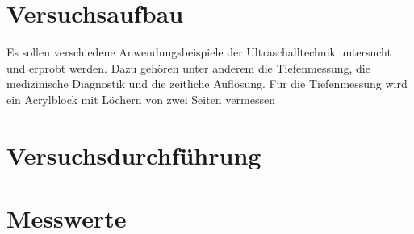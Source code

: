 


\section{Versuchsaufbau}

Es sollen verschiedene Anwendungsbeispiele der Ultraschalltechnik untersucht und erprobt werden.
Dazu gehören unter anderem die Tiefenmessung, die medizinische Diagnostik und die zeitliche Auflösung.
Für die Tiefenmessung wird ein Acrylblock mit Löchern von zwei Seiten vermessen

\section{Versuchsdurchführung}

\section{Messwerte}



